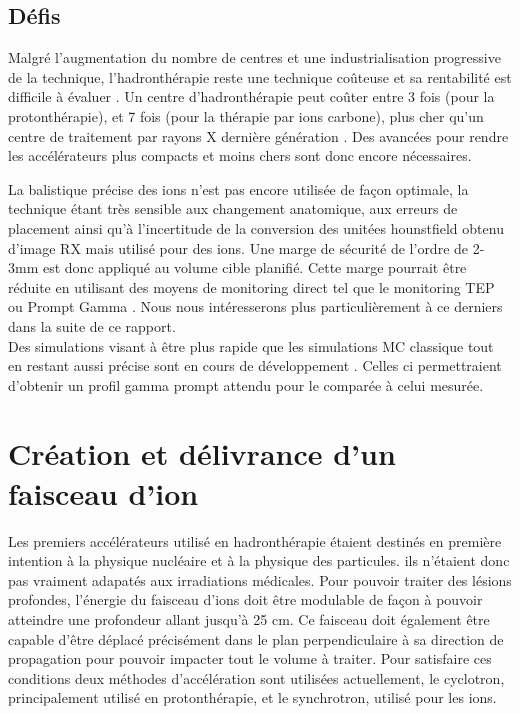 \documentclass[11pt,a4paper,oldfontcommands]{memoir}
\begin{document}
\subsection{Défis}
Malgré l'augmentation du nombre de centres et une industrialisation progressive de la technique, l'hadronthérapie reste une technique coûteuse et sa rentabilité est difficile à évaluer \cite{LIEVENS2013134}. Un centre d'hadronthérapie peut coûter entre 3 fois (pour la protonthérapie), et 7 fois (pour la thérapie par ions carbone), plus cher qu'un centre de traitement par rayons X dernière génération \cite{Nupecc}. Des avancées pour rendre les accélérateurs plus compacts et moins chers sont donc encore nécessaires.


La balistique précise des ions n'est pas encore utilisée de façon optimale, la technique étant très sensible aux changement anatomique, aux erreurs de placement ainsi qu'à l'incertitude de la conversion des unitées hounstfield obtenu d'image RX mais utilisé pour des ions\cite{Paganetti2012}. Une marge de sécurité de l'ordre de 2-3mm est donc appliqué au volume cible planifié. Cette marge pourrait être réduite en utilisant des moyens de monitoring direct tel que le monitoring TEP \cite{ENGHARDT2004284} ou Prompt Gamma \cite{PGMonitoringC12}. Nous nous intéresserons plus particulièrement à ce derniers dans la suite de ce rapport. \\
Des simulations visant à être plus rapide que les simulations MC classique tout en restant aussi précise sont en cours de développement \cite{Huisman_2016}\cite{Embriaco_2018}\cite{Sterpin_2015}. Celles ci permettraient d'obtenir un profil gamma prompt attendu pour le comparée à celui mesurée.

\section{Création et délivrance d'un faisceau d'ion}
Les premiers accélérateurs utilisé en hadronthérapie étaient destinés en première intention à la physique nucléaire et à la physique des particules. ils n'étaient donc pas vraiment adapatés aux irradiations médicales. Pour pouvoir traiter des lésions profondes, l'énergie du faisceau d'ions doit être modulable de façon à pouvoir atteindre une profondeur allant jusqu'à 25 cm. Ce faisceau doit également être capable d'être déplacé précisément dans le plan perpendiculaire à sa direction de propagation pour pouvoir impacter tout le volume à traiter. Pour satisfaire ces conditions deux méthodes d'accélération sont utilisées actuellement, le cyclotron, principalement utilisé en protonthérapie, et le synchrotron, utilisé pour les ions.
\end{document}
